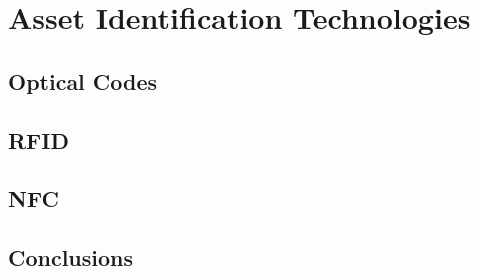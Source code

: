 \section{Asset Identification Technologies}

\subsection{Optical Codes}




\subsection{RFID}

\subsection{NFC}

\subsection{Conclusions}
